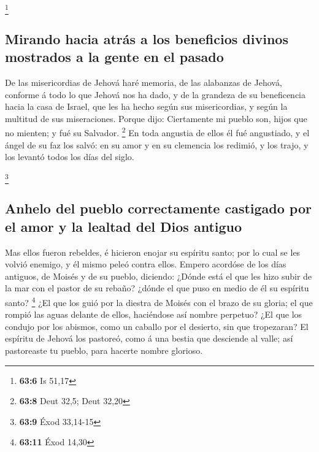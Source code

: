 \footnote{\textbf{63:6} Is 51,17}

\hypertarget{mirando-hacia-atruxe1s-a-los-beneficios-divinos-mostrados-a-la-gente-en-el-pasado}{%
\subsection{Mirando hacia atrás a los beneficios divinos mostrados a la
gente en el
pasado}\label{mirando-hacia-atruxe1s-a-los-beneficios-divinos-mostrados-a-la-gente-en-el-pasado}}

 De las misericordias de Jehová haré memoria, de las
alabanzas de Jehová, conforme á todo lo que Jehová nos ha dado, y de la
grandeza de su beneficencia hacia la casa de Israel, que les ha hecho
según sus misericordias, y según la multitud de sus miseraciones.
 Porque dijo: Ciertamente mi pueblo son, hijos que no
mienten; y fué su Salvador. \footnote{\textbf{63:8} Deut 32,5; Deut
  32,20}  En toda angustia de ellos él fué angustiado, y
el ángel de su faz los salvó: en su amor y en su clemencia los redimió,
y los trajo, y los levantó todos los días del siglo.

\footnote{\textbf{63:9} Éxod 33,14-15}

\hypertarget{anhelo-del-pueblo-correctamente-castigado-por-el-amor-y-la-lealtad-del-dios-antiguo}{%
\subsection{Anhelo del pueblo correctamente castigado por el amor y la
lealtad del Dios
antiguo}\label{anhelo-del-pueblo-correctamente-castigado-por-el-amor-y-la-lealtad-del-dios-antiguo}}

 Mas ellos fueron rebeldes, é hicieron enojar su espíritu
santo; por lo cual se les volvió enemigo, y él mismo peleó contra ellos.
 Empero acordóse de los días antiguos, de Moisés y de su
pueblo, diciendo: ¿Dónde está el que les hizo subir de la mar con el
pastor de su rebaño? ¿dónde el que puso en medio de él su espíritu
santo? \footnote{\textbf{63:11} Éxod 14,30}  ¿El que los
guió por la diestra de Moisés con el brazo de su gloria; el que rompió
las aguas delante de ellos, haciéndose así nombre perpetuo?
 ¿El que los condujo por los abismos, como un caballo por
el desierto, sin que tropezaran?  El espíritu de Jehová
los pastoreó, como á una bestia que desciende al valle; así pastoreaste
tu pueblo, para hacerte nombre glorioso.

